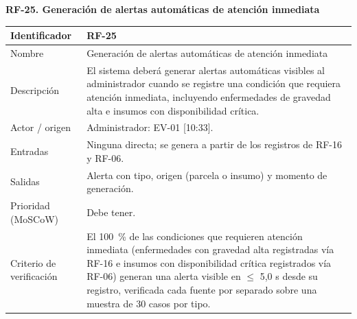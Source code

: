 \documentclass[12pt,a4paper]{article}
\begin{document}
\begin{minipage}{\linewidth}
\bigskip
\noindent\textbf{RF-25. Generación de alertas automáticas de atención inmediata}
\label{tab:RF-25}

\begin{center}
\begin{tabular}{|p{3.5cm}|p{10.7cm}|}
\hline
Identificador & RF-25 \\
\hline
Nombre & Generación de alertas automáticas de atención inmediata \\
\hline
Descripción & El sistema deberá generar alertas automáticas visibles al administrador cuando se registre una condición que requiera atención inmediata, incluyendo enfermedades de gravedad alta e insumos con disponibilidad crítica. \\
\hline
Actor / origen & Administrador: EV-01 [10:33]. \\
\hline
Entradas & Ninguna directa; se genera a partir de los registros de RF-16 y RF-06. \\
\hline
Salidas & Alerta con tipo, origen (parcela o insumo) y momento de generación. \\
\hline
Prioridad (MoSCoW) & Debe tener. \\
\hline
Criterio de verificación & El 100~\% de las condiciones que requieren atención inmediata (enfermedades con gravedad alta registradas vía RF-16 e insumos con disponibilidad crítica registrados vía RF-06) generan una alerta visible en $\leq$ 5,0 s desde su registro, verificada cada fuente por separado sobre una muestra de 30 casos por tipo. \\
\hline
\end{tabular}
\end{center}
\end{minipage}
\end{document}
